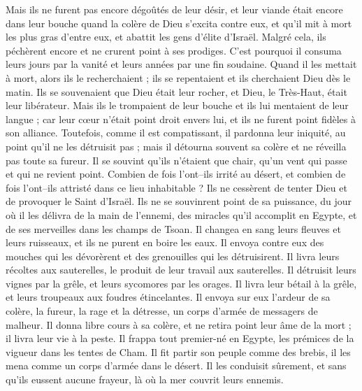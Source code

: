 \begin{multicols}{2}
Mais ils ne furent pas encore dégoûtés de leur désir, et leur viande était encore dans leur bouche
quand la colère de Dieu s'excita contre eux, et qu'il mit à mort les plus gras d'entre eux, et abattit les gens d'élite d'Israël.
Malgré cela, ils péchèrent encore et ne crurent point à ses prodiges.
C'est pourquoi il consuma leurs jours par la vanité et leurs années par une fin soudaine.
Quand il les mettait à mort, alors ils le recherchaient ; ils se repentaient et ils cherchaient Dieu dès le matin.
Ils se souvenaient que Dieu était leur rocher, et Dieu, le Très-Haut, était leur libérateur.
Mais ils le trompaient de leur bouche et ils lui mentaient de leur langue ;
car leur cœur n'était point droit envers lui, et ils ne furent point fidèles à son alliance.
Toutefois, comme il est compatissant, il pardonna leur iniquité, au point qu'il ne les détruisit pas ; mais il détourna souvent sa colère et ne réveilla pas toute sa fureur.
Il se souvint qu'ils n'étaient que chair, qu'un vent qui passe et qui ne revient point.
Combien de fois l'ont–ils irrité au désert, et combien de fois l'ont–ils attristé dans ce lieu inhabitable ?
Ils ne cessèrent de tenter Dieu et de provoquer le Saint d'Israël.
Ils ne se souvinrent point de sa puissance, du jour où il les délivra de la main de l'ennemi,
des miracles qu'il accomplit en Egypte, et de ses merveilles dans les champs de Tsoan.
Il changea en sang leurs fleuves et leurs ruisseaux, et ils ne purent en boire les eaux.
Il envoya contre eux des mouches qui les dévorèrent et des grenouilles qui les détruisirent.
Il livra leurs récoltes aux sauterelles, le produit de leur travail aux sauterelles.
Il détruisit leurs vignes par la grêle, et leurs sycomores par les orages.
Il livra leur bétail à la grêle, et leurs troupeaux aux foudres étincelantes.
Il envoya sur eux l'ardeur de sa colère, la fureur, la rage et la détresse, un corps d'armée de messagers de malheur.
Il donna libre cours à sa colère, et ne retira point leur âme de la mort ; il livra leur vie à la peste.
Il frappa tout premier-né en Egypte, les prémices de la vigueur dans les tentes de Cham.
Il fit partir son peuple comme des brebis, il les mena comme un corps d'armée dans le désert.
Il les conduisit sûrement, et sans qu'ils eussent aucune frayeur, là où la mer couvrit leurs ennemis.

\end{multicols}
